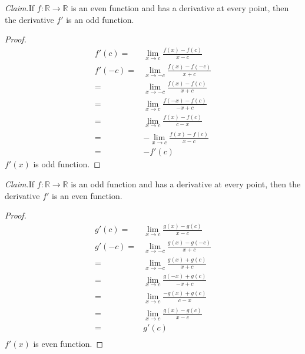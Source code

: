 \documentclass{article}
\newenvironment{claim}[1]{\par\noindent\textit{Claim.}\space#1}{}
\begin{document}
    \section{}
        \begin{claim}
            If $f:\mathbb{R}\rightarrow \mathbb{R}$ is an even function and  has a derivative at every point, then the derivative $f'$ is an odd function.
        \end{claim}
        \begin{proof}
            \begin{equation*}
                \begin{split}
                    f'(c)=&\lim_{x\rightarrow c}\frac{f(x)-f(c)}{x-c}\\
                    f'(-c)=&\lim_{x\rightarrow -c}\frac{f(x)-f(-c)}{x+c}\\
                        =&\lim_{x\rightarrow -c}\frac{f(x)-f(c)}{x+c}\\
                        =&\lim_{x\rightarrow c}\frac{f(-x)-f(c)}{-x+c}\\
                        =&\lim_{x\rightarrow c}\frac{f(x)-f(c)}{c-x}\\
                        =&-\lim_{x\rightarrow c}\frac{f(x)-f(c)}{x-c}\\
                        =&-f'(c)
                \end{split}
            \end{equation*}
            $f'(x)$ is odd function.
        \end{proof}
        \begin{claim}
            If $f:\mathbb{R}\rightarrow \mathbb{R}$ is an odd function and  has a derivative at every point, then the derivative $f'$ is an even function.
        \end{claim}
        \begin{proof}
            \begin{equation*}
                \begin{split}
                    g'(c)=&\lim_{x\rightarrow c}\frac{g(x)-g(c)}{x-c}\\
                    g'(-c)=&\lim_{x\rightarrow -c}\frac{g(x)-g(-c)}{x+c}\\
                        =&\lim_{x\rightarrow -c}\frac{g(x)+g(c)}{x+c}\\
                        =&\lim_{x\rightarrow c}\frac{g(-x)+g(c)}{-x+c}\\
                        =&\lim_{x\rightarrow c}\frac{-g(x)+g(c)}{c-x}\\
                        =&\lim_{x\rightarrow c}\frac{g(x)-g(c)}{x-c}\\
                        =&g'(c)\\
                \end{split}
            \end{equation*}
            $f'(x)$ is even function.
        \end{proof}
\end{document}
